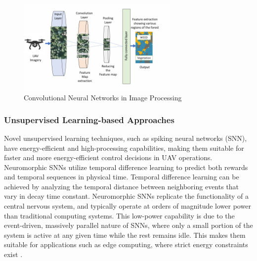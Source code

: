 \begin{enumerate}
    \begin{figure}[H]
        \centering
        \includegraphics[width=0.7\textwidth]{Figures/Chapter2/Section1/6.png}
        \caption{Convolutional Neural Networks in Image Processing~\cite{kurunathan2022machine}}
        \label{cnn_image_processing}
    \end{figure}

\end{enumerate}



\subsubsection{Unsupervised Learning-based Approaches}
    
    Novel unsupervised learning techniques, such as spiking neural networks (SNN), have energy-efficient and high-processing capabilities, making them suitable for faster and more energy-efficient control decisions in UAV operations. Neuromorphic SNNs utilize temporal difference learning to predict both rewards and temporal sequences in physical time. Temporal difference learning can be achieved by analyzing the temporal distance between neighboring events that vary in decay time constant. Neuromorphic SNNs replicate the functionality of a central nervous system, and typically operate at orders of magnitude lower power than traditional computing systems. This low-power capability is due to the event-driven, massively parallel nature of SNNs, where only a small portion of the system is active at any given time while the rest remains idle. This makes them suitable for applications such as edge computing, where strict energy constraints exist \cite{kurunathan2022machine}. 


